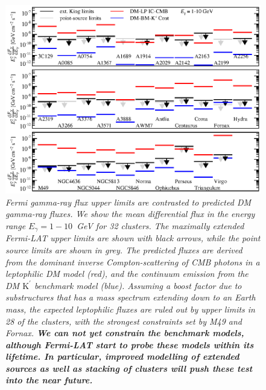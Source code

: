 \documentclass[10pt,aps,pra,reprint,amsmath,amsfonts,amssymb,showpacs,nofootinbib,floatfix]{revtex4-1}
\def\C#1{{\bf #1}}
\newcommand{\Fermi}{{\em Fermi}\xspace}
\newcommand{\rmn}{\mathrm}
\newcommand{\Kp}{\rmn{K}^\prime}
\begin{document}
\begin{figure}
\begin{minipage}{2.0\columnwidth}
  \includegraphics[width=0.99\columnwidth]{figures/Fermi.comp.DM.eps}
  \caption{\it \Fermi gamma-ray flux upper limits are contrasted to
    predicted DM gamma-ray fluxes. We show the mean differential flux
    in the energy range $E_\gamma=1-10$~GeV for 32 clusters. The
    maximally extended \Fermi-LAT upper limits are shown with black
    arrows, while the point source limits are shown in grey. The
    predicted fluxes are derived from the dominant inverse
    Compton-scattering of CMB photons in a leptophilic DM model (red),
    and the continuum emission from the DM $\Kp$ benchmark model
    (blue). Assuming a boost factor due to substructures that has a
    mass spectrum extending down to an Earth mass, the expected
    leptophilic fluxes are ruled out by upper limits in 28 of the
    clusters, with the strongest constraints set by M49 and
    Fornax. \C{We can not yet constrain the benchmark models, although
      \Fermi-LAT start to probe these models within its lifetime. In
      particular, improved modelling of extended sources as well as
      stacking of clusters will push these test into the near
      future.}}
 \label{fig14}
\end{minipage}
\end{figure}
\end{document}
